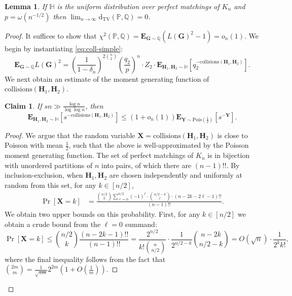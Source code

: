 \documentclass[10pt,a4paper]{amsart}
\newcommand{\deltanH}{\delta_{n}}
\newtheorem{lem}{Lemma}
\newtheorem{claim}{Claim}
\newcommand{\bG}{\mathbf{G}}
\newcommand{\bH}{\mathbf{H}}
\newcommand{\bX}{\mathbf{X}}
\newcommand{\bY}{\mathbf{Y}}
\newcommand{\bbH}{\mathbb{H}}
\newcommand{\bbP}{\mathbb{P}}
\newcommand{\bbQ}{\mathbb{Q}}
\newcommand{\dtv}{\mathrm{d}_{\mathrm{TV}}}
\newcommand{\e}{{\mathbf E}}
\begin{document}
\begin{lem}
If $\bbH$ is the uniform distribution over perfect matchings of $K_n$ and $p = \omega(n^{-1/2})$ then $\lim_{n \to \infty} \dtv(\bbP,\bbQ) = 0$.
\end{lem}

\begin{proof}
It suffices to show that $\chi^2(\bbP,\bbQ) = \e_{\bG \sim \bbQ} (L(\bG)^2 - 1) =o_n(1)$.
We begin by instantiating \cref{eq:coll-simple}:
\begin{equation}\label{eq:coll-simple-matching}
\e_{\bG \sim \bbQ} L(\bG)^2 =
\left(\frac{1}{1-\deltanH}\right)^{2\binom{n}{2}}\left(\frac{q_2}{p}\right)^{n} \cdot Z_2 \cdot \e_{\bH_1,\bH_2 \sim \bbH} \left[q_2^{-\mathrm{collisions}(\bH_1,\bH_2)}\right].
\end{equation}
We next obtain an estimate of the moment generating function of $\mathrm{collisions}(\bH_1,\bH_2)$.
\begin{claim}\label{claim:pois-mgf}
    If $s n \gg \frac{\log n}{\log\log n}$, then
    \[
    \e_{\bH_1,\bH_2 \sim \bbH}\left[s^{-\mathrm{collisions}(\bH_1,\bH_2)}\right] \le \left(1 + o_n(1)\right) \e_{\bY \sim \mathrm{Pois}(\frac{1}{2})}\left[s^{-\bY}\right].
    \]
\end{claim}
\begin{proof}
    
We argue that the random variable $\bX = \mathrm{collisions}(\bH_1,\bH_2)$ is close to Poisson with mean $\frac{1}{2}$, such that the above is well-approximated by the Poisson moment generating function.
The set of perfect matchings of $K_n$ is in bijection with unordered partitions of $n$ into pairs, of which there are $(n-1)!!$.
By inclusion-exclusion, when $\bH_1,\bH_2$ are chosen independently and uniformly at random from this set, for any $k \in [n/2]$,
\begin{align*} 
\Pr [\bX = k] 
&= \frac{\binom{n/2}{k}\sum_{\ell=0}^{n/2} (-1)^\ell \cdot\binom{n/2 - k}{\ell} \cdot (n-2k - 2\ell-1)!!}{(n-1)!!}.
\end{align*}
We obtain two upper bounds on this probability.
First, for any $k \in [n/2]$ we obtain a crude bound from the $\ell=0$ summand:
\[
\Pr[\bX = k]
\le \binom{n/2}{k}\frac{(n-2k-1)!!}{(n-1)!!} 
= \frac{2^{n/2}}{k!\binom{n}{n/2}} \cdot \frac{1}{2^{n/2-k}} \binom{n-2k}{n/2-k} 
= O(\sqrt{n}) \cdot \frac{1}{2^k k!},
\]
where the final inequality follows from the fact that $\binom{2m}{m} = \frac{1}{\sqrt{\pi m }}2^{2m}(1+O(\tfrac{1}{m}))$.


\end{proof}
\end{proof}
\end{document}
